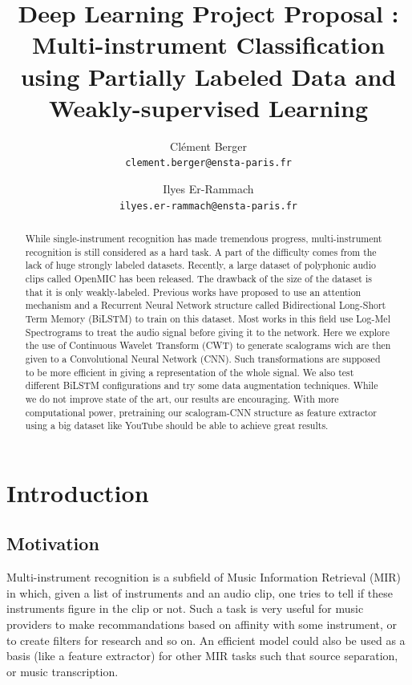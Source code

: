 \documentclass[final]{cvpr}
\begin{document}
\title{Deep Learning Project Proposal : Multi-instrument Classification using Partially Labeled Data and Weakly-supervised Learning}

\author{
	Clément Berger\\
	{\tt\small clement.berger@ensta-paris.fr}
\and Ilyes Er-Rammach\\
{\tt\small ilyes.er-rammach@ensta-paris.fr}

}

\maketitle
\begin{abstract}
	While single-instrument recognition has made tremendous progress, multi-instrument recognition is still considered as a hard task. A part of the difficulty comes from the lack of huge strongly labeled datasets. Recently, a large dataset of polyphonic audio clips called OpenMIC has been released. The drawback of the size of the dataset is that it is only weakly-labeled. Previous works have proposed to use an attention mechanism and a Recurrent Neural Network structure called Bidirectional Long-Short Term Memory (BiLSTM) to train on this dataset. Most works in this field use Log-Mel Spectrograms to treat the audio signal before giving it to the network. Here we explore the use of Continuous Wavelet Transform (CWT) to generate scalograms wich are then given to a Convolutional Neural Network (CNN). Such transformations are supposed to be more efficient in giving a representation of the whole signal. We also test different BiLSTM configurations and try some data augmentation techniques. While we do not improve state of the art, our results are encouraging. With more computational power, pretraining our scalogram-CNN structure as feature extractor using a big dataset like YouTube should be able to achieve great results.
\end{abstract}
\section{Introduction}
\subsection{Motivation}
Multi-instrument recognition is a subfield of Music Information Retrieval (MIR) in which, given a list of instruments and an audio clip, one tries to tell if these instruments figure in the clip or not. Such a task is very useful for music providers to make recommandations based on affinity with some instrument, or to create filters for research and so on. An efficient model could also be used as a basis (like a feature extractor) for other MIR tasks such that source separation, or music transcription.
\end{document}
